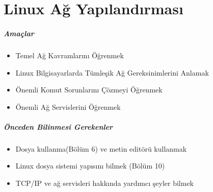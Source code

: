 \chapter{Linux Ağ Yapılandırması}
\paragraph{Amaçlar}{
\begin{itemize}
 \item Temel Ağ Kavramlarını Öğrenmek
 \item Linux Bilgisayarlarda Tümleşik Ağ Gereksinimlerini Anlamak
 \item Önemli Komut Sorunlarını Çözmeyi Öğrenmek
 \item Önemli Ağ Servislerini Öğrenmek
 \end{itemize}}
\paragraph{Önceden Bilinmesi Gerekenler}
\begin{itemize}
 \item Dosya kullanma(Bölüm 6) ve metin editörü kullanmak
 \item Linux dosya sistemi yapısını bilmek (Bölüm 10)
 \item TCP/IP ve ağ servisleri hakkında yardımcı şeyler bilmek
 \end{itemize}
